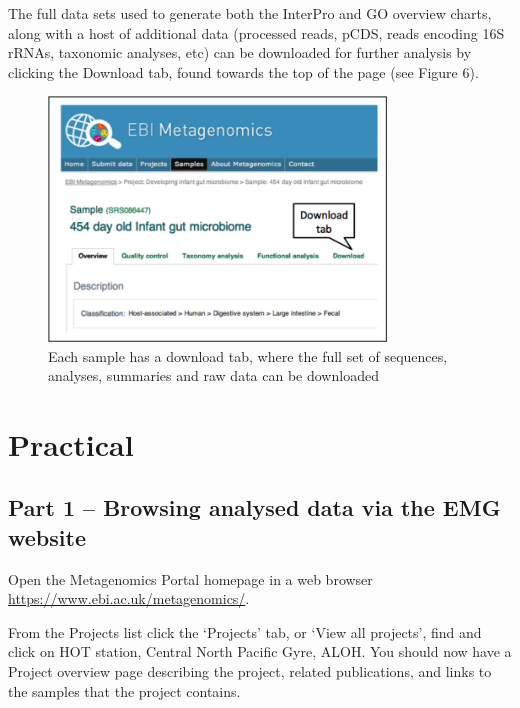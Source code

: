 The full data sets used to generate both the InterPro and GO overview charts, along with a host of additional data (processed reads, pCDS, reads encoding 16S rRNAs, taxonomic analyses, etc) can be downloaded for further analysis by clicking the Download tab, found towards the top of the page (see Figure 6).

\begin{figure}[Figure 6]
\centering
\includegraphics[width=0.8\textwidth]{handout/FA_DL.png}
\caption{Each sample has a download tab, where the full set of sequences, analyses, summaries and raw data can be downloaded}
\label{fig:FA_DL}
\end{figure}

\section{Practical}

\subsection{Part 1 – Browsing analysed data via the EMG website}

\begin{steps}
Open the Metagenomics Portal homepage in a web browser \url{https://www.ebi.ac.uk/metagenomics/}.

From the Projects list click the ‘Projects’ tab, or ‘View all projects’, find and click on HOT station, Central North Pacific Gyre, ALOH.
You should now have a Project overview page describing the project, related publications, and links to the samples that the project contains.
\end{steps}


